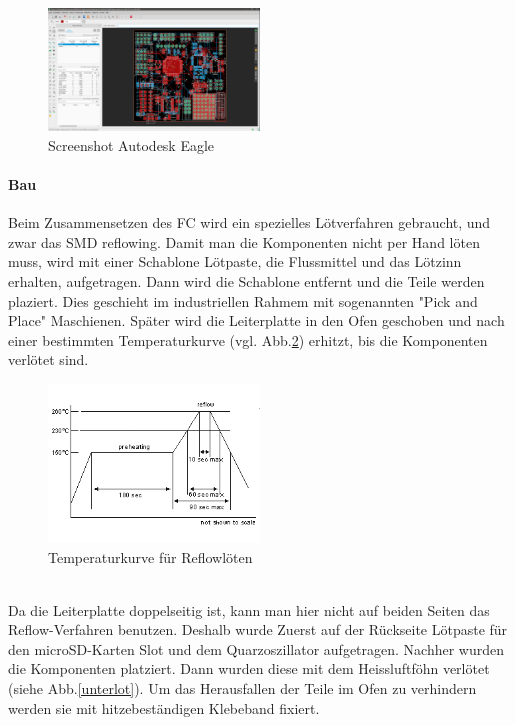 \documentclass[12pt,a4paper, ngerman]{article}
\begin{document}
\begin{figure}[h]
\centering
\includegraphics[width=0.5\textwidth]{egl.png}
\caption[Eigenes Bild]{Screenshot Autodesk Eagle} \label{eagle}
\end{figure}

\paragraph{Bau}
Beim Zusammensetzen des FC wird ein spezielles Lötverfahren gebraucht, und zwar das SMD reflowing. Damit man die Komponenten nicht per Hand löten muss, wird mit einer Schablone Lötpaste, die Flussmittel und das Lötzinn erhalten, aufgetragen. Dann wird die Schablone entfernt und die Teile werden plaziert. Dies geschieht im industriellen Rahmem mit sogenannten "Pick and Place" Maschienen. Später wird die Leiterplatte in den Ofen geschoben und nach einer bestimmten Temperaturkurve (vgl. Abb.\ref{reflow}) erhitzt, bis die Komponenten verlötet sind\cite{website:sauter-elektronik.de_reflow}.
\begin{figure}[h]
\centering
\includegraphics[width=0.5\textwidth]{reflow.png}
\caption[\url{http://www.comtec-crystals.com/images/service/reflow.gif}]{Temperaturkurve für Reflowlöten}\label{reflow}
\end{figure} \\
Da die Leiterplatte doppelseitig ist, kann man hier nicht auf beiden Seiten das Reflow-Verfahren benutzen. Deshalb wurde Zuerst auf der Rückseite Lötpaste für den microSD-Karten Slot und dem Quarzoszillator aufgetragen. Nachher wurden die Komponenten platziert. Dann wurden diese mit dem Heissluftföhn verlötet (siehe Abb.\ref{unterlot}). Um das Herausfallen der Teile im Ofen zu verhindern werden sie mit hitzebeständigen Klebeband fixiert. \\
\end{document}
